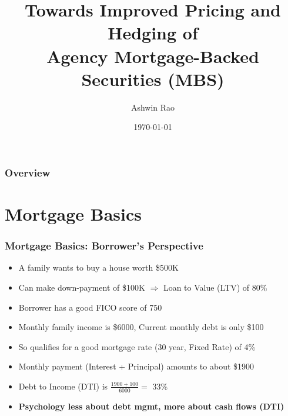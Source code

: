 \documentclass{beamer}
\title[Agency MBS Pricing]{Towards Improved Pricing and Hedging of \\ Agency Mortgage-Backed Securities (MBS)} %
\author{Ashwin Rao} %
\institute[AFTLab Seminar @ Stanford] %
{
Presentation for AFTLab Seminar at Stanford University\\ %
}
\date{\today} %
\begin{document}
\begin{frame}
\titlepage %
\end{frame}

\begin{frame}
\frametitle{Overview} %
\tableofcontents %
\end{frame}

\section{Mortgage Basics}

\begin{frame}
\frametitle{Mortgage Basics: Borrower's Perspective}
\begin{itemize}
\item A family wants to buy a house worth \$500K
\item Can make down-payment of \$100K $\Rightarrow$ Loan to Value (LTV) of 80\%
\item Borrower has a good FICO score of 750
\item Monthly family income is \$6000, Current monthly debt is only \$100
\item So qualifies for a good mortgage rate (30 year, Fixed Rate) of 4\%
\item Monthly payment (Interest + Principal) amounts to about \$1900
\item Debt to Income (DTI) is $\frac {1900 + 100} {6000} =$ 33\%
\item {\bf Psychology less about debt mgmt, more about cash flows (DTI)}
\end{itemize}
\end{frame}
\end{document}
